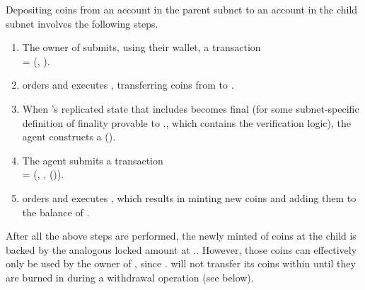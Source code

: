 Depositing  coins from an account  in the parent subnet  to an account  in the child subnet 
involves the following steps.

\begin{enumerate}

    \item The owner of  submits, using their wallet, a transaction\\
     = (, ).
    
    \item {} orders and executes , transferring  coins from  to .
    
    \item \label{item:deposit-step-create-pof}
    When 's replicated state that includes  becomes final (for some subnet-specific definition of finality provable to .\gw, which contains the \pof verification logic),
    the \ipc agent constructs a {\pof}().
    
    \item \label{item:deposit-step-submit-pof}
    The \ipc agent submits a transaction\\
     = (, , {\pof}()).
    
    \item {} orders and executes , which results in minting  new coins and adding them to the balance of .
    
\end{enumerate}

After all the above steps are performed, the newly minted  of coins at the child is backed by the analogous locked amount at ..
However, those coins can effectively only be used by the owner of ,
since . will not transfer its coins within  until they are burned in  during a withdrawal operation (see below).

